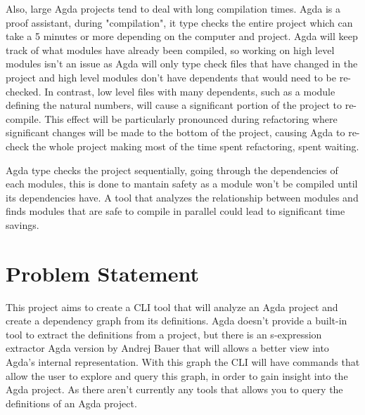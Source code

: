 Also, large Agda projects tend to deal with long compilation times. Agda is a
proof assistant, during "compilation", it type checks the entire project which
can take a 5 minutes or more depending on the computer and project. Agda will
keep track of what modules have already been compiled, so working on high level
modules isn't an issue as Agda will only type check files that have changed in
the project and high level modules don't have dependents that would need to be
re-checked. In contrast, low level files with many dependents, such as a module
defining the natural numbers, will cause a significant portion of the project
to re-compile. This effect will be particularly pronounced during refactoring
where significant changes will be made to the bottom of the project, causing
Agda to re-check the whole project making most of the time spent refactoring,
spent waiting. 

Agda type checks the project sequentially, going through the dependencies of
each modules, this is done to mantain safety as a module won't be compiled
until its dependencies have. A tool that analyzes the relationship between
modules and finds modules that are safe to compile in parallel could lead to
significant time savings.




\section{Problem Statement}

This project aims to create a CLI tool that will analyze an Agda project and
create a dependency graph from its definitions. Agda doesn't provide a built-in
tool to extract the definitions from a project, but there is an s-expression
extractor Agda version by Andrej Bauer \cite{andrej} that will allows a better
view into Agda's internal representation. With this graph the CLI will have
commands that allow the user to explore and query this graph, in order to gain
insight into the Agda project. As there aren't currently any tools that allows
you to query the definitions of an Agda project.

